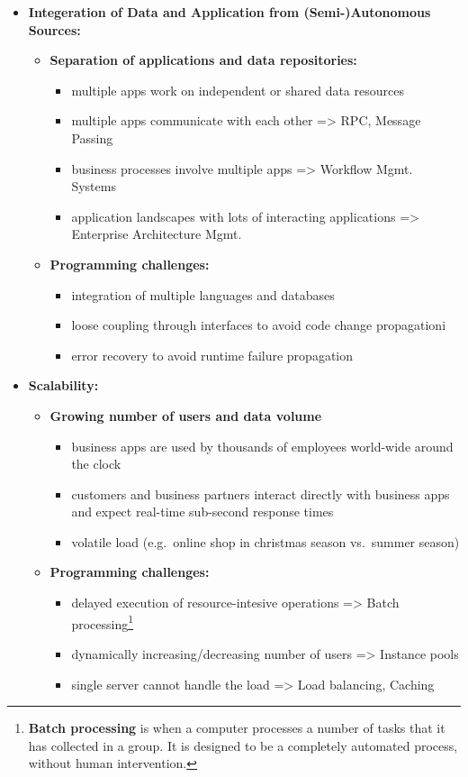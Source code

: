 \documentclass[ieeetran]{article}
\begin{document}
\begin{itemize}
\item \textbf{Integeration of Data and Application from (Semi-)Autonomous Sources:}
	\begin{itemize}
	  \item \textbf{Separation of applications and data repositories:}
		  \begin{itemize}
		    \item multiple apps work on independent or shared data resources
			    \item multiple apps communicate with each other => RPC, Message Passing
			\item business processes involve multiple apps => Workflow Mgmt. Systems
			\item application landscapes with lots of interacting applications => Enterprise Architecture Mgmt.
		  \end{itemize}

		  \item \textbf{Programming challenges:}
			  \begin{itemize}
				  \item integration of multiple languages and databases
				\item loose coupling through interfaces to avoid code change propagationi
				\item error recovery to avoid runtime failure propagation
			  \end{itemize}
	\end{itemize}

\item \textbf{Scalability:}
	\begin{itemize}
	  \item \textbf{Growing number of users and data volume}
		  \begin{itemize}
		    \item business apps are used by thousands of employees world-wide around the clock
		\item customers and business partners interact directly with business apps and expect real-time sub-second response times
		\item volatile load (e.g.\ online shop in christmas season vs.\ summer season)
		  \end{itemize}
		  \item \textbf{Programming challenges:}
			  \begin{itemize}
				  \item delayed execution of resource-intesive operations => Batch processing\footnote{\textbf{Batch processing} is when a computer processes a number of tasks that it has collected in a group. It is designed to be a completely automated process, without human intervention.}
				    \item dynamically increasing/decreasing number of users => Instance pools
					    \item single server cannot handle the load => Load balancing, Caching
		
			  \end{itemize}
	\end{itemize}
\end{itemize}
\end{document}
